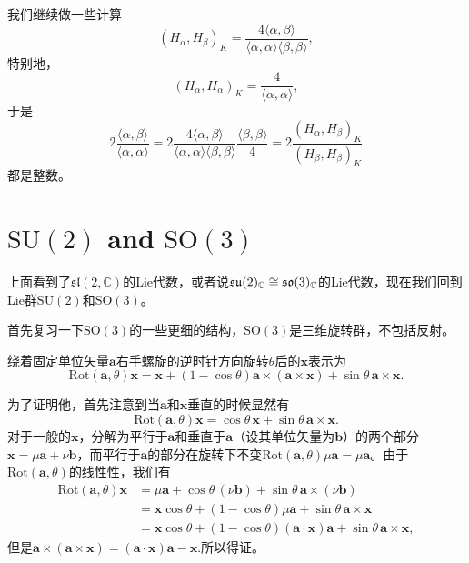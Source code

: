我们继续做一些计算
\[
(H_\alpha,H_\beta)_K=\frac{4\langle \alpha,\beta \rangle}{\langle \alpha,\alpha \rangle\langle \beta,\beta \rangle},
\]
特别地，
\[
(H_\alpha,H_\alpha)_K=\frac{4}{\langle \alpha,\alpha \rangle},
\]
于是
\[
	2\frac{\langle \alpha,\beta \rangle}{\langle \alpha,\alpha \rangle}=2\frac{4\langle \alpha,\beta \rangle}{\langle \alpha,\alpha \rangle\langle \beta,\beta \rangle}\frac{\langle \beta,\beta \rangle}{4}=2\frac{(H_\alpha,H_\beta)_K}{(H_\beta,H_\beta)_K}
\]
都是整数。

\section{$\mathrm{SU}(2)$ and $\mathrm{SO}(3)$}
上面看到了$\mathfrak{sl}(2,\mathbb{C})$的Lie代数，或者说$\mathfrak{su}(2)_{\mathbb{C}}\cong\mathfrak{so}(3)_{\mathbb{C}}$的Lie代数，现在我们回到Lie群$\mathrm{SU}(2)$和$\mathrm{SO}(3)$。

首先复习一下$\mathrm{SO}(3)$的一些更细的结构，$\mathrm{SO}(3)$是三维旋转群，不包括反射。


\pro
绕着固定单位矢量$\mathbf{a}$右手螺旋的逆时针方向旋转$\theta$后的$\mathbf{x}$表示为
\[
\mathrm{Rot}(\mathbf{a},\theta)\mathbf{x}=\mathbf{x}+(1-\cos\theta)\mathbf{a}\times(\mathbf{a}\times\mathbf{x})+
\sin\theta\,\mathbf{a}\times\mathbf{x}.
\]


为了证明他，首先注意到当$\mathbf{a}$和$\mathbf{x}$垂直的时候显然有
\[
\mathrm{Rot}(\mathbf{a},\theta)\mathbf{x}=\cos\theta\,\mathbf{x}+
\sin\theta\,\mathbf{a}\times\mathbf{x}.
\]
对于一般的$\mathbf{x}$，分解为平行于$\mathbf{a}$和垂直于$\mathbf{a}$（设其单位矢量为$\mathbf{b}$）的两个部分$\mathbf{x}=\mu\mathbf{a}+\nu\mathbf{b}$，而平行于$\mathbf{a}$的部分在旋转下不变$\mathrm{Rot}(\mathbf{a},\theta)\mu\mathbf{a}=\mu\mathbf{a}$。由于$\mathrm{Rot}(\mathbf{a},\theta)$的线性性，我们有
\[
\begin{split}
\mathrm{Rot}(\mathbf{a},\theta)\mathbf{x}&=\mu\mathbf{a}+\cos\theta\,(\nu\mathbf{b})+
\sin\theta\,\mathbf{a}\times(\nu\mathbf{b})\\
&=\mathbf{x}\cos\theta+(1-\cos\theta)\mu\mathbf{a}+
\sin\theta\,\mathbf{a}\times\mathbf{x}\\
&=\mathbf{x}\cos\theta+(1-\cos\theta)(\mathbf{a}\cdot\mathbf{x})\mathbf{a}+
\sin\theta\,\mathbf{a}\times \mathbf{x},
\end{split}
\]
但是$\mathbf{a}\times(\mathbf{a}\times\mathbf{x})=(\mathbf{a}\cdot\mathbf{x})\mathbf{a}-\mathbf{x}$.所以得证。

